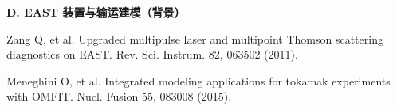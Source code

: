 \documentclass[12pt,a4paper]{article}
\begin{document}
\noindent\textbf{D. EAST 装置与输运建模（背景）}
\begin{enumerate}[label={[\arabic*]}]
    \item Zang Q, et al. Upgraded multipulse laser and multipoint Thomson scattering diagnostics on EAST. Rev. Sci. Instrum. 82, 063502 (2011).
    \item Meneghini O, et al. Integrated modeling applications for tokamak experiments with OMFIT. Nucl. Fusion 55, 083008 (2015).
\end{enumerate}
\end{document}
